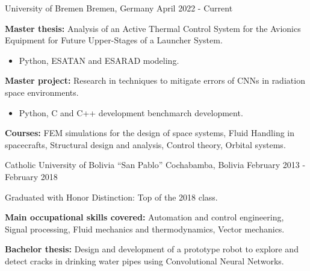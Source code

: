 

\begin{cventries}
  {University of Bremen}
  {Bremen, Germany}
  {April 2022 - Current}
  {
    \begin{cvitems}
      \item \textbf{Master thesis:} Analysis of an Active Thermal
      Control System for the Avionics Equipment for Future
      Upper-Stages of a Launcher System.
      \begin{itemize}
        \item[\bullet] Python, ESATAN and ESARAD modeling. 
      \end{itemize}
      \item \textbf{Master project:} Research in techniques to
      mitigate errors of CNNs in radiation space environments.
      \begin{itemize}
        \item[\bullet] Python, C and C++ development benchmarch development. 
      \end{itemize}
      \item \textbf{Courses:} FEM simulations for the design of space
      systems, Fluid Handling in spacecrafts, Structural design and
      analysis, Control theory, Orbital systems.
    \end{cvitems}
  }

  {Catholic University of Bolivia ``San Pablo''}
  {Cochabamba, Bolivia}
  {February 2013 - February 2018}
  {
    \begin{cvitems}
      \item Graduated with Honor Distinction: Top of the 2018 class.
      \item \textbf{Main occupational skills covered:} Automation and
      control engineering, Signal processing, Fluid mechanics and
      thermodynamics, Vector mechanics.
      \item \textbf{Bachelor thesis:} Design and development of a
      prototype robot to explore and detect cracks in drinking water
      pipes using Convolutional Neural Networks.
    \end{cvitems}
  }


\end{cventries}
